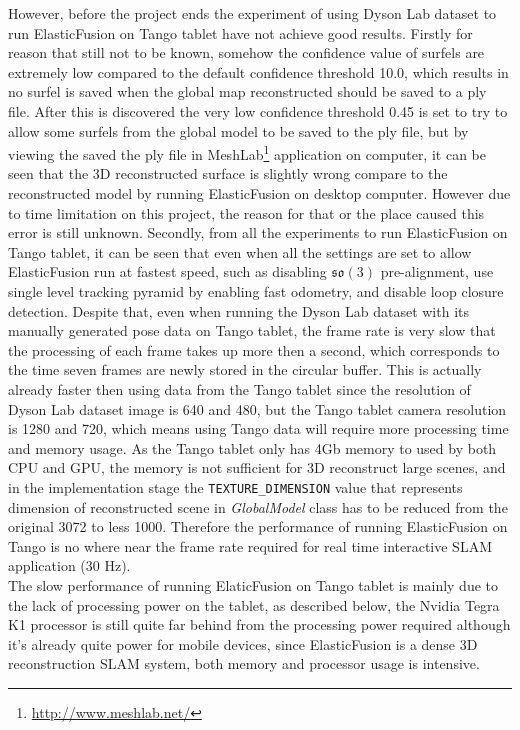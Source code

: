 \documentclass[12pt,twoside]{article}
\begin{document}
However, before the project ends the experiment of using Dyson Lab dataset to run ElasticFusion on Tango tablet have not achieve good results. Firstly for reason that still not to be known, somehow the confidence value of surfels are extremely low compared to the default confidence threshold 10.0, which results in no surfel is saved when the global map reconstructed should be saved to a ply file. After this is discovered the very low confidence threshold 0.45 is set to try to allow some surfels from the global model to be saved to the ply file, but by viewing the saved the ply file in MeshLab\footnote{\url{http://www.meshlab.net/}} application on computer, it can be seen that the 3D reconstructed surface is slightly wrong compare to the reconstructed model by running ElasticFusion on desktop computer. However due to time limitation on this project, the reason for that or the place caused this error is still unknown. Secondly, from all the experiments to run ElasticFusion on Tango tablet, it can be seen that even when all the settings are set to allow ElasticFusion run at fastest speed, such as disabling $\mathfrak{so}(3)$ pre-alignment, use single level tracking pyramid by enabling fast odometry, and disable loop closure detection. Despite that, even when running the Dyson Lab dataset with its manually generated pose data on Tango tablet, the frame rate is very slow that the processing of each frame takes up more then a second, which corresponds to the time seven frames are newly stored in the circular buffer. This is actually already faster then using data from the Tango tablet since the resolution of Dyson Lab dataset image is 640 and 480, but the Tango tablet camera resolution is 1280 and 720, which means using Tango data will require more processing time and memory usage. As the Tango tablet only has 4Gb memory to used by both CPU and GPU, the memory is not sufficient for 3D reconstruct large scenes, and in the implementation stage the \verb|TEXTURE_DIMENSION| value that represents dimension of reconstructed scene in \textit{GlobalModel} class has to be reduced from the original 3072 to less 1000. Therefore the performance of running ElasticFusion on Tango is no where near the frame rate required for real time interactive SLAM application (30 Hz).\\
The slow performance of running ElaticFusion on Tango tablet is mainly due to the lack of processing power on the tablet, as described below, the Nvidia Tegra K1 processor is still quite far behind from the processing power required although it's already quite power for mobile devices, since ElasticFusion is a dense 3D reconstruction SLAM system, both memory and processor usage is intensive.\\
\end{document}
